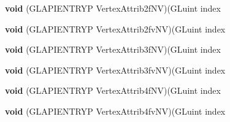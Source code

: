 \begin{DoxyCompactItemize}
{\bfseries void} (G\+L\+A\+P\+I\+E\+N\+T\+R\+YP Vertex\+Attrib2f\+NV)(G\+Luint index
\item 
\mbox{\label{struct_g_lvertexformat_a0a57ae8e4098b61d5f845e704d7f9d3c}} 
{\bfseries void} (G\+L\+A\+P\+I\+E\+N\+T\+R\+YP Vertex\+Attrib2fv\+NV)(G\+Luint index
\item 
\mbox{\label{struct_g_lvertexformat_a9d8d2c8120854f2ff4629e0adeb7eb86}} 
{\bfseries void} (G\+L\+A\+P\+I\+E\+N\+T\+R\+YP Vertex\+Attrib3f\+NV)(G\+Luint index
\item 
\mbox{\label{struct_g_lvertexformat_a02b0af574d1aa4b566049c54440f3748}} 
{\bfseries void} (G\+L\+A\+P\+I\+E\+N\+T\+R\+YP Vertex\+Attrib3fv\+NV)(G\+Luint index
\item 
\mbox{\label{struct_g_lvertexformat_a31ca7e5a00d3b574791a6aa4d4ae168b}} 
{\bfseries void} (G\+L\+A\+P\+I\+E\+N\+T\+R\+YP Vertex\+Attrib4f\+NV)(G\+Luint index
\item 
\mbox{\label{struct_g_lvertexformat_afea2106210be15948ce97fd8859ba2f5}} 
{\bfseries void} (G\+L\+A\+P\+I\+E\+N\+T\+R\+YP Vertex\+Attrib4fv\+NV)(G\+Luint index
\end{DoxyCompactItemize}
